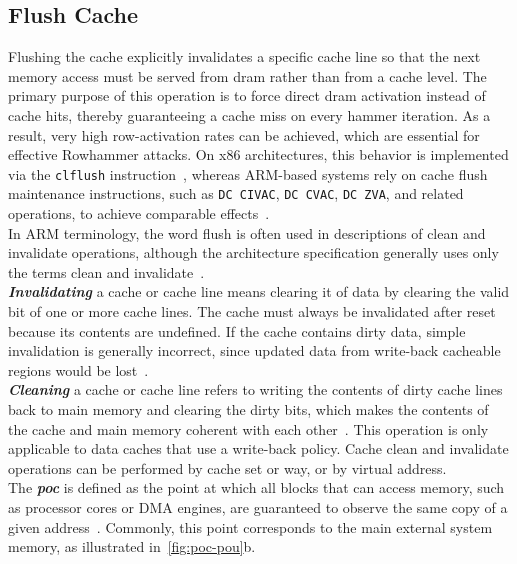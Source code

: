 \subsection{Flush Cache} \label{subsec:flush-cache}
    Flushing the cache explicitly invalidates a specific cache line so that the next memory access must be 
    served from \gls{dram} rather than from a cache level. The primary purpose of this operation is to force 
    direct \gls{dram} activation instead of cache hits, thereby guaranteeing a cache miss on every hammer iteration. 
    As a result, very high row-activation rates can be achieved, which are essential for effective Rowhammer 
    attacks. On x86 architectures, this behavior is implemented via the \texttt{clflush} instruction~\cite{paperFlippingBits}, whereas 
    ARM-based systems rely on cache flush maintenance instructions, such as \texttt{DC CIVAC}, \texttt{DC CVAC}, \texttt{DC ZVA}, and 
    related operations, to achieve comparable effects~\cite{paperTriggeringRHHardwareFault}.
    \\
    In ARM terminology, the word flush is often used in descriptions of clean and invalidate 
    operations, although the architecture specification generally uses only the terms clean and invalidate~\cite{thesisCacheAttacksandRH}.
    \\
    \textit{\textbf{Invalidating}} a cache or cache line means clearing it of data by clearing the valid bit of one 
    or more cache lines. The cache must always be invalidated after reset because its contents are undefined. 
    If the cache contains dirty data, simple invalidation is generally incorrect, since updated data from 
    write-back cacheable regions would be lost~\cite{datasheetCortexASeries}.
    \\
    \textit{\textbf{Cleaning}} a cache or cache line refers to writing the contents of dirty cache lines back to main memory 
    and clearing the dirty bits, which makes the contents of the cache and main memory coherent with each 
    other~\cite{datasheetCortexASeries, thesisCacheAttacksandRH}. This operation is only applicable to data caches that use a write-back policy. Cache 
    clean and invalidate operations can be performed by cache set or way, or by virtual address.
    \\
    The \textit{\textbf{\gls{poc}}} is defined as the point at which all blocks that can access memory, such 
    as processor cores or DMA engines, are guaranteed to observe the same copy of a given address~\cite{datasheetCortexASeries}. 
    Commonly, this point corresponds to the main external system memory, as illustrated in~\cref{fig:poc-pou}b. 
